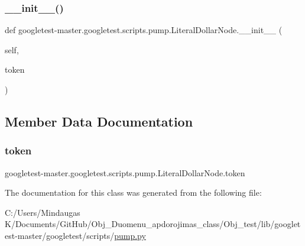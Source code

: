 \subsubsection{\texorpdfstring{\_\_init\_\_()}{\_\_init\_\_()}}
{\footnotesize\ttfamily def googletest-\/master.\+googletest.\+scripts.\+pump.\+Literal\+Dollar\+Node.\+\_\+\+\_\+init\+\_\+\+\_\+ (\begin{DoxyParamCaption}\item[{}]{self,  }\item[{}]{token }\end{DoxyParamCaption})}



\subsection{Member Data Documentation}
\mbox{\label{classgoogletest-master_1_1googletest_1_1scripts_1_1pump_1_1_literal_dollar_node_a389f82743b7f7d4846f45ea1926439dc}} 
\subsubsection{\texorpdfstring{token}{token}}
{\footnotesize\ttfamily googletest-\/master.\+googletest.\+scripts.\+pump.\+Literal\+Dollar\+Node.\+token}



The documentation for this class was generated from the following file\+:\begin{DoxyCompactItemize}
\item 
C\+:/\+Users/\+Mindaugas K/\+Documents/\+Git\+Hub/\+Obj\+\_\+\+Duomenu\+\_\+apdorojimas\+\_\+class/\+Obj\+\_\+test/lib/googletest-\/master/googletest/scripts/\mbox{\hyperlink{_obj__test_2lib_2googletest-master_2googletest_2scripts_2pump_8py}{pump.\+py}}\end{DoxyCompactItemize}

